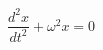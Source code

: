 \documentclass[preview]{standalone}
\begin{document}
\begin{align*}
\dfrac{d^2 x}{dt^2} + \omega^2 x = 0
\end{align*}
\end{document}
